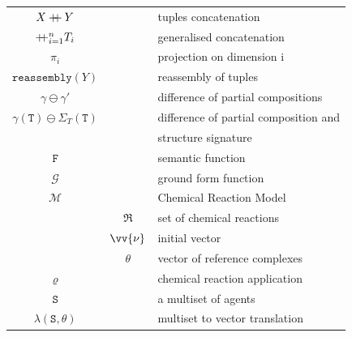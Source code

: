\documentclass[12pt]{fithesis2}
\newcommand\mdoubleplus{\mathbin{+\mkern-7mu+}}
\begin{document}
\begin{tabular}{c c | l}
$X \mdoubleplus Y$ & & tuples concatenation\\
$\mdoubleplus_{i=1}^n T_i$ & & generalised concatenation\\
$\pi_i$ & & projection on dimension i\\
$\mathtt{reassembly}(Y)$ & & reassembly of tuples\\
$\gamma \ominus \gamma'$ & & difference of partial compositions\\
$\gamma(\mathtt{T}) \ominus \Sigma_T(\mathtt{T})$ & & difference of partial composition and\\
 & & structure signature\\
$\mathtt{F}$ & & semantic function\\
$\mathcal{G}$ & & ground form function\\
$\mathcal{M}$ & & Chemical Reaction Model\\
 & $\mathfrak{R}$ & set of chemical reactions\\
 & $\vv{\nu}$ & initial vector\\
 & $\theta$ & vector of reference complexes\\
$\varrho$ & & chemical reaction application\\
$\mathtt{S}$ & & a multiset of agents\\
$\lambda(\mathtt{S}, \theta)$ & & multiset to vector translation\\
\end{tabular}
\end{document}
